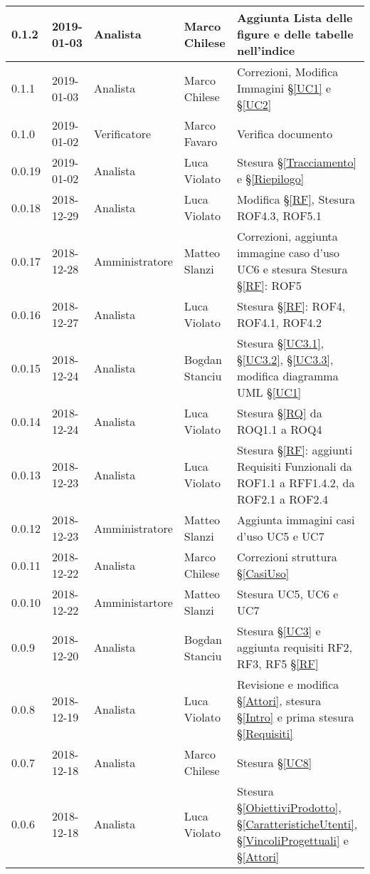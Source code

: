 \begin{center}
\begin{longtable}[C]{|m{}|m{}|m{}|m{}|p{}|}
\hline
0.1.2 & 2019-01-03 & Analista & Marco Chilese & Aggiunta Lista delle figure e delle tabelle nell'indice\\
\hline
\rowcolor{grigio}0.1.1 & 2019-01-03 & Analista & Marco Chilese & Correzioni, Modifica Immagini §\ref{UC1} e §\ref{UC2}\\
\hline
 0.1.0 & 2019-01-02 & Verificatore & Marco Favaro & Verifica documento\\
\hline
\rowcolor{grigio}0.0.19 & 2019-01-02 & Analista & Luca Violato & Stesura §\ref{Tracciamento} e §\ref{Riepilogo}\\
\hline
0.0.18 & 2018-12-29 & Analista & Luca Violato & Modifica §\ref{RF}, Stesura ROF4.3, ROF5.1\\
\hline
\rowcolor{grigio}0.0.17 & 2018-12-28 & Amministratore & Matteo Slanzi & Correzioni, aggiunta immagine caso d'uso UC6 e stesura Stesura §\ref{RF}: ROF5\\
\hline
0.0.16 & 2018-12-27 & Analista & Luca Violato & Stesura §\ref{RF}: ROF4, ROF4.1, ROF4.2\\
\hline
\rowcolor{grigio}0.0.15 & 2018-12-24 & Analista & Bogdan Stanciu & Stesura §\ref{UC3.1}, §\ref{UC3.2}, §\ref{UC3.3}, modifica diagramma UML §\ref{UC1} \\
\hline
0.0.14 & 2018-12-24 & Analista & Luca Violato & Stesura §\ref{RQ} da ROQ1.1 a ROQ4\\
\hline
\rowcolor{grigio}0.0.13 & 2018-12-23 & Analista & Luca Violato & Stesura §\ref{RF}: aggiunti Requisiti Funzionali da ROF1.1 a RFF1.4.2, da ROF2.1 a ROF2.4\\
\hline
0.0.12 & 2018-12-23 & Amministratore & Matteo Slanzi & Aggiunta immagini casi d'uso UC5 e UC7\\
\hline
\rowcolor{grigio}0.0.11 & 2018-12-22 & Analista & Marco Chilese & Correzioni struttura §\ref{CasiUso}\\
\hline
0.0.10 & 2018-12-22 & Amministartore & Matteo Slanzi & Stesura UC5, UC6 e UC7   \\
\hline
\rowcolor{grigio}0.0.9 & 2018-12-20 & Analista & Bogdan Stanciu & Stesura §\ref{UC3} e aggiunta requisiti RF2, RF3, RF5 §\ref{RF} \\
\hline
0.0.8 & 2018-12-19 & Analista & Luca Violato & Revisione e modifica §\ref{Attori}, stesura §\ref{Intro} e prima stesura §\ref{Requisiti} \\
\hline
\rowcolor{grigio}0.0.7 & 2018-12-18 & Analista & Marco Chilese & Stesura §\ref{UC8}\\
\hline
0.0.6 & 2018-12-18 & Analista & Luca Violato & Stesura §\ref{ObiettiviProdotto}, §\ref{CaratteristicheUtenti}, §\ref{VincoliProgettuali} e §\ref{Attori}\\

\end{longtable}
\end{center}
